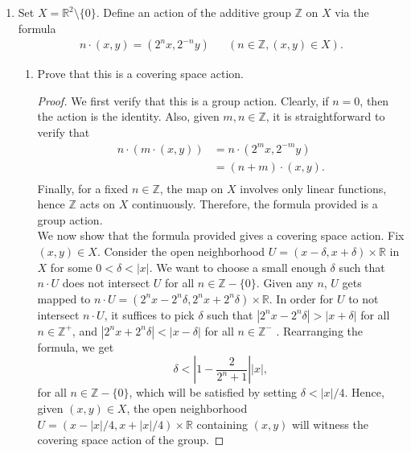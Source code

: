 \documentclass{article}
\begin{document}
\begin{enumerate}
  \item Set $X=\mathbb{R}^2\setminus\{0\}$. Define an action of the
    additive group $\mathbb{Z}$ on $X$ via the formula
    \begin{align*}
      n\cdot(x,y) = (2^nx,2^{-n}y)  &&  (n\in\mathbb{Z},(x,y)\in X).
    \end{align*}

    \begin{enumerate}
      \item Prove that this is a covering space action.
        \begin{proof}
          We first verify that this is a group action. Clearly, if $n=0$,
          then the action is the identity. Also, given $m,n\in\mathbb{Z}$,
          it is straightforward to verify that
          \begin{align*}
            n\cdot(m\cdot(x,y)) &= n\cdot(2^mx,2^{-m}y) \\
                                &= (n+m)\cdot(x,y). \\
          \end{align*}
          Finally, for a fixed $n\in\mathbb{Z}$, the map on $X$ involves
          only linear functions, hence $\mathbb{Z}$ acts on $X$
          continuously. Therefore, the formula provided is a group action.
          \\

          We now show that the formula provided gives a covering space
          action. Fix $(x,y)\in X$. Consider the open neighborhood
          $U=(x-\delta,x+\delta)\times\mathbb{R}$ in $X$ for some
          $0<\delta<|x|$. We want to choose a small enough $\delta$ such
          that $n\cdot U$ does not intersect $U$ for all
          $n\in\mathbb{Z}-\{0\}$. Given any $n$, $U$ gets mapped to
          $n\cdot U=(2^nx-2^n\delta,2^nx+2^n\delta)\times\mathbb{R}$. In
          order for $U$ to not intersect $n\cdot U$, it suffices to pick
          $\delta$ such that $|2^nx-2^n\delta|>|x+\delta|$ for all
          $n\in\mathbb{Z}^+$, and $|2^nx+2^n\delta|<|x-\delta|$ for all
          $n\in\mathbb{Z}^-$ . Rearranging the formula, we get
          \begin{equation*}
            \delta < \left|1-\frac{2}{2^n+1}\right||x|,
          \end{equation*}
          for all $n\in\mathbb{Z}-\{0\}$, which will be satisfied by
          setting $\delta<|x|/4$. Hence, given $(x,y)\in X$, the open
          neighborhood $U=(x-|x|/4,x+|x|/4)\times\mathbb{R}$ containing
          $(x,y)$ will witness the covering space action of the group.
        \end{proof}


\end{enumerate}
\end{enumerate}
\end{document}
